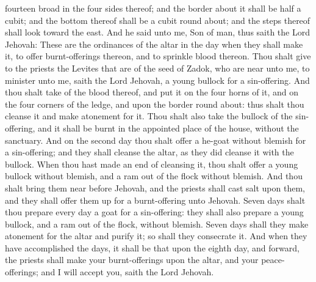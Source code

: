 fourteen broad in the four sides thereof; and the border about it shall be half a cubit; and the bottom thereof shall be a cubit round about; and the steps thereof shall look toward the east.  And he said unto me, Son of man, thus saith the Lord Jehovah: These are the ordinances of the altar in the day when they shall make it, to offer burnt-offerings thereon, and to sprinkle blood thereon. Thou shalt give to the priests the Levites that are of the seed of Zadok, who are near unto me, to minister unto me, saith the Lord Jehovah, a young bullock for a sin-offering. And thou shalt take of the blood thereof, and put it on the four horns of it, and on the four corners of the ledge, and upon the border round about: thus shalt thou cleanse it and make atonement for it. Thou shalt also take the bullock of the sin-offering, and it shall be burnt in the appointed place of the house, without the sanctuary. And on the second day thou shalt offer a he-goat without blemish for a sin-offering; and they shall cleanse the altar, as they did cleanse it with the bullock. When thou hast made an end of cleansing it, thou shalt offer a young bullock without blemish, and a ram out of the flock without blemish. And thou shalt bring them near before Jehovah, and the priests shall cast salt upon them, and they shall offer them up for a burnt-offering unto Jehovah. Seven days shalt thou prepare every day a goat for a sin-offering: they shall also prepare a young bullock, and a ram out of the flock, without blemish. Seven days shall they make atonement for the altar and purify it; so shall they consecrate it. And when they have accomplished the days, it shall be that upon the eighth day, and forward, the priests shall make your burnt-offerings upon the altar, and your peace-offerings; and I will accept you, saith the Lord Jehovah. 


